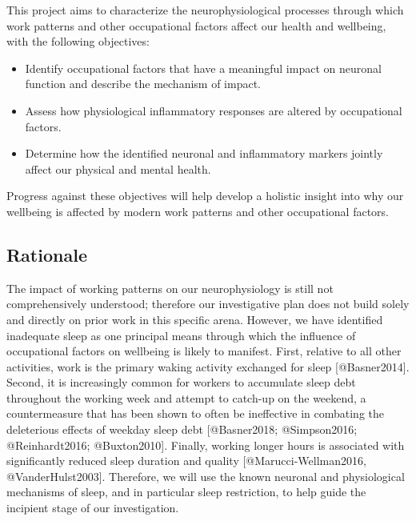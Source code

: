 \documentclass[
]{article}
\providecommand{\tightlist}{%
  \setlength{\itemsep}{0pt}\setlength{\parskip}{0pt}}
\begin{document}
This project aims to characterize the neurophysiological processes
through which work patterns and other occupational factors affect our
health and wellbeing, with the following objectives:

\begin{itemize}
\tightlist
\item
  Identify occupational factors that have a meaningful impact on
  neuronal function and describe the mechanism of impact.
\item
  Assess how physiological inflammatory responses are altered by
  occupational factors.
\item
  Determine how the identified neuronal and inflammatory markers jointly
  affect our physical and mental health.
\end{itemize}

Progress against these objectives will help develop a holistic insight
into why our wellbeing is affected by modern work patterns and other
occupational factors.

\newpage

\hypertarget{rationale}{%
\subsection{Rationale}\label{rationale}}

The impact of working patterns on our neurophysiology is still not
comprehensively understood; therefore our investigative plan does not
build solely and directly on prior work in this specific arena. However,
we have identified inadequate sleep as one principal means through which
the influence of occupational factors on wellbeing is likely to
manifest. First, relative to all other activities, work is the primary
waking activity exchanged for sleep {[}@Basner2014{]}. Second, it is
increasingly common for workers to accumulate sleep debt throughout the
working week and attempt to catch-up on the weekend, a countermeasure
that has been shown to often be ineffective in combating the deleterious
effects of weekday sleep debt {[}@Basner2018; @Simpson2016;
@Reinhardt2016; @Buxton2010{]}. Finally, working longer hours is
associated with significantly reduced sleep duration and quality
{[}@Marucci-Wellman2016, @VanderHulst2003{]}. Therefore, we will use the
known neuronal and physiological mechanisms of sleep, and in particular
sleep restriction, to help guide the incipient stage of our
investigation.
\end{document}
